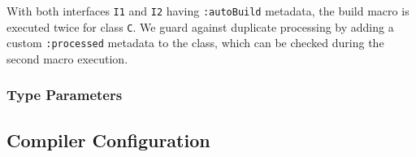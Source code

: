 \documentclass{article}
\newcommand{\type}[1]{\texttt{#1}}
\newcommand{\expr}[1]{\texttt{#1}}
\begin{document}
With both interfaces \type{I1} and \type{I2} having \expr{:autoBuild} metadata, the build macro is executed twice for class \type{C}. We guard against duplicate processing by adding a custom \expr{:processed} metadata to the class, which can be checked during the second macro execution.


\subsubsection{Type Parameters}



\subsection{Compiler Configuration}
\label{Compiler Configuration}
\end{document}
